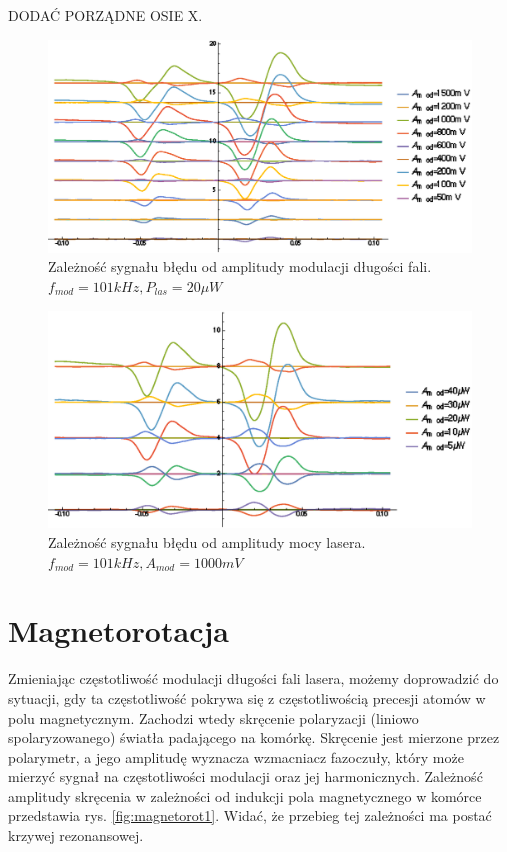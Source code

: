 \documentclass[a4paper,10pt]{article}
\begin{document}
DODAĆ PORZĄDNE OSIE X.

\begin{figure}[h!]
\centering
 \includegraphics[width=\textwidth]{panoramy_1H_oda.eps}
 \caption{Zależność sygnału błędu od amplitudy modulacji długości fali. $f_{mod}=101kHz, P_{las}=20 \mu W$}
 \label{fig:panoda}
\end{figure}

\begin{figure}[h!]
\centering
 \includegraphics[width=\textwidth]{panoramy_1H_odp.eps}
 \caption{Zależność sygnału błędu od amplitudy mocy lasera. $f_{mod}=101kHz, A_{mod}=1000mV$}
 \label{fig:panodp}
\end{figure}

\section{Magnetorotacja}
\label{sec:magnetorotacja}


Zmieniając częstotliwość modulacji długości fali lasera, możemy doprowadzić do sytuacji, gdy ta częstotliwość pokrywa się z częstotliwością precesji atomów w polu magnetycznym.
Zachodzi wtedy skręcenie polaryzacji (liniowo spolaryzowanego) światła padającego na komórkę. Skręcenie jest mierzone przez polarymetr, a jego amplitudę wyznacza wzmacniacz fazoczuły, który może mierzyć sygnał na częstotliwości modulacji oraz jej harmonicznych. Zależność amplitudy skręcenia w zależności od indukcji pola magnetycznego w komórce przedstawia rys. \ref{fig:magnetorot1}. Widać, że przebieg tej zależności ma postać krzywej rezonansowej.
\end{document}
